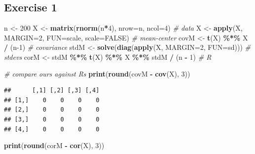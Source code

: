 \documentclass[
]{book}
\newenvironment{Shaded}{\begin{snugshade}}{\end{snugshade}}
\newcommand{\CommentTok}[1]{\textcolor[rgb]{0.56,0.35,0.01}{\textit{#1}}}
\newcommand{\DataTypeTok}[1]{\textcolor[rgb]{0.13,0.29,0.53}{#1}}
\newcommand{\DecValTok}[1]{\textcolor[rgb]{0.00,0.00,0.81}{#1}}
\newcommand{\KeywordTok}[1]{\textcolor[rgb]{0.13,0.29,0.53}{\textbf{#1}}}
\newcommand{\NormalTok}[1]{#1}
\newcommand{\OperatorTok}[1]{\textcolor[rgb]{0.81,0.36,0.00}{\textbf{#1}}}
\newcommand{\OtherTok}[1]{\textcolor[rgb]{0.56,0.35,0.01}{#1}}
\newcommand{\StringTok}[1]{\textcolor[rgb]{0.31,0.60,0.02}{#1}}
\begin{document}
\hypertarget{exercise-1-11}{%
\subsection*{Exercise 1}\label{exercise-1-11}}

\begin{Shaded}
\begin{Highlighting}[]
\NormalTok{n \textless{}{-}}\StringTok{ }\DecValTok{200}
\NormalTok{X \textless{}{-}}\StringTok{ }\KeywordTok{matrix}\NormalTok{(}\KeywordTok{rnorm}\NormalTok{(n}\OperatorTok{*}\DecValTok{4}\NormalTok{), }\DataTypeTok{nrow=}\NormalTok{n, }\DataTypeTok{ncol=}\DecValTok{4}\NormalTok{) }\CommentTok{\# data}
\NormalTok{X \textless{}{-}}\StringTok{ }\KeywordTok{apply}\NormalTok{(X, }\DataTypeTok{MARGIN=}\DecValTok{2}\NormalTok{, }\DataTypeTok{FUN=}\NormalTok{scale, }\DataTypeTok{scale=}\OtherTok{FALSE}\NormalTok{) }\CommentTok{\# mean{-}center}
\NormalTok{covM \textless{}{-}}\StringTok{ }\KeywordTok{t}\NormalTok{(X) }\OperatorTok{\%*\%}\StringTok{ }\NormalTok{X }\OperatorTok{/}\StringTok{ }\NormalTok{(n}\DecValTok{{-}1}\NormalTok{) }\CommentTok{\# covariance}
\NormalTok{stdM \textless{}{-}}\StringTok{ }\KeywordTok{solve}\NormalTok{(}\KeywordTok{diag}\NormalTok{(}\KeywordTok{apply}\NormalTok{(X, }\DataTypeTok{MARGIN=}\DecValTok{2}\NormalTok{, }\DataTypeTok{FUN=}\NormalTok{sd))) }\CommentTok{\# stdevs}
\NormalTok{corM \textless{}{-}}\StringTok{ }\NormalTok{stdM }\OperatorTok{\%*\%}\StringTok{ }\KeywordTok{t}\NormalTok{(X) }\OperatorTok{\%*\%}\StringTok{ }\NormalTok{X }\OperatorTok{\%*\%}\StringTok{ }\NormalTok{stdM }\OperatorTok{/}\StringTok{ }\NormalTok{(n }\OperatorTok{{-}}\StringTok{ }\DecValTok{1}\NormalTok{) }\CommentTok{\# R}

\CommentTok{\# compare ours against R\textquotesingle{}s}
\KeywordTok{print}\NormalTok{(}\KeywordTok{round}\NormalTok{(covM }\OperatorTok{{-}}\StringTok{ }\KeywordTok{cov}\NormalTok{(X), }\DecValTok{3}\NormalTok{))}
\end{Highlighting}
\end{Shaded}

\begin{verbatim}
##      [,1] [,2] [,3] [,4]
## [1,]    0    0    0    0
## [2,]    0    0    0    0
## [3,]    0    0    0    0
## [4,]    0    0    0    0
\end{verbatim}

\begin{Shaded}
\begin{Highlighting}[]
\KeywordTok{print}\NormalTok{(}\KeywordTok{round}\NormalTok{(corM }\OperatorTok{{-}}\StringTok{ }\KeywordTok{cor}\NormalTok{(X), }\DecValTok{3}\NormalTok{))}
\end{Highlighting}
\end{Shaded}
\end{document}
